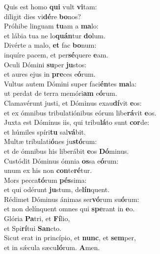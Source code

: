 \evenverse Quis est homo \textbf{qui} vult \textbf{vi}tam:~\*\\
\evenverse díligit dies vi\textbf{dé}re \textbf{bo}nos?\\
\oddverse Próhibe linguam \textbf{tu}am a \textbf{ma}lo:~\*\\
\oddverse et lábia tua ne lo\textbf{quán}tur \textbf{do}lum.\\
\evenverse Divérte a malo, \textbf{et} fac \textbf{bo}num:~\*\\
\evenverse inquíre pacem, et per\textbf{sé}quere \textbf{e}am.\\
\oddverse Oculi Dómini \textbf{su}per \textbf{ju}stos:~\*\\
\oddverse et aures ejus in \textbf{pre}ces e\textbf{ó}rum.\\
\evenverse Vultus autem Dómini super faci\textbf{én}tes \textbf{ma}la:~\*\\
\evenverse ut perdat de terra memóri\textbf{am} e\textbf{ó}rum.\\
\oddverse Clamavérunt justi, et Dóminus exau\textbf{dí}vit \textbf{e}os:~\*\\
\oddverse et ex ómnibus tribulatiónibus eórum libe\textbf{rá}vit \textbf{e}os.\\
\evenverse Juxta est Dóminus iis, qui tribu\textbf{lá}to sunt \textbf{cor}de:~\*\\
\evenverse et húmiles spíri\textbf{tu} sal\textbf{vá}bit.\\
\oddverse Multæ tribulati\textbf{ó}nes ju\textbf{stó}rum:~\*\\
\oddverse et de ómnibus his liberábit \textbf{e}os \textbf{Dó}minus.\\
\evenverse Custódit Dóminus ómnia \textbf{os}sa e\textbf{ó}rum:~\*\\
\evenverse unum ex his non \textbf{con}te\textbf{ré}tur.\\
\oddverse Mors pecca\textbf{tó}rum \textbf{pés}sima:~\*\\
\oddverse et qui odérunt \textbf{ju}stum, de\textbf{lín}quent.\\
\evenverse Rédimet Dóminus ánimas ser\textbf{vó}rum su\textbf{ó}rum:~\*\\
\evenverse et non delínquent omnes qui \textbf{spe}rant in \textbf{e}o.\\
\oddverse Glória \textbf{Pa}tri, et \textbf{Fí}lio,~\*\\
\oddverse et Spi\textbf{rí}tui \textbf{San}cto.\\
\evenverse Sicut erat in princípio, et \textbf{nunc}, et \textbf{sem}per,~\*\\
\evenverse et in sǽcula sæcu\textbf{ló}rum. \textbf{A}men.\\
